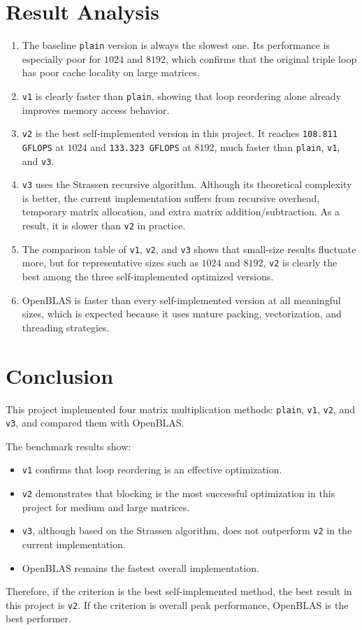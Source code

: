 \documentclass[11pt,a4paper]{article}
\begin{document}
\section{Result Analysis}
\begin{enumerate}
    \item The baseline \texttt{plain} version is always the slowest one. Its performance is especially poor for \(1024\) and \(8192\), which confirms that the original triple loop has poor cache locality on large matrices.
    \item \texttt{v1} is clearly faster than \texttt{plain}, showing that loop reordering alone already improves memory access behavior.
    \item \texttt{v2} is the best self-implemented version in this project. It reaches \texttt{108.811 GFLOPS} at \(1024\) and \texttt{133.323 GFLOPS} at \(8192\), much faster than \texttt{plain}, \texttt{v1}, and \texttt{v3}.
    \item \texttt{v3} uses the Strassen recursive algorithm. Although its theoretical complexity is better, the current implementation suffers from recursive overhead, temporary matrix allocation, and extra matrix addition/subtraction. As a result, it is slower than \texttt{v2} in practice.
    \item The comparison table of \texttt{v1}, \texttt{v2}, and \texttt{v3} shows that small-size results fluctuate more, but for representative sizes such as \(1024\) and \(8192\), \texttt{v2} is clearly the best among the three self-implemented optimized versions.
    \item OpenBLAS is faster than every self-implemented version at all meaningful sizes, which is expected because it uses mature packing, vectorization, and threading strategies.
\end{enumerate}

\section{Conclusion}
This project implemented four matrix multiplication methods: \texttt{plain}, \texttt{v1}, \texttt{v2}, and \texttt{v3}, and compared them with OpenBLAS.

The benchmark results show:
\begin{itemize}
    \item \texttt{v1} confirms that loop reordering is an effective optimization.
    \item \texttt{v2} demonstrates that blocking is the most successful optimization in this project for medium and large matrices.
    \item \texttt{v3}, although based on the Strassen algorithm, does not outperform \texttt{v2} in the current implementation.
    \item OpenBLAS remains the fastest overall implementation.
\end{itemize}

Therefore, if the criterion is the best self-implemented method, the best result in this project is \texttt{v2}. If the criterion is overall peak performance, OpenBLAS is the best performer.
\end{document}
